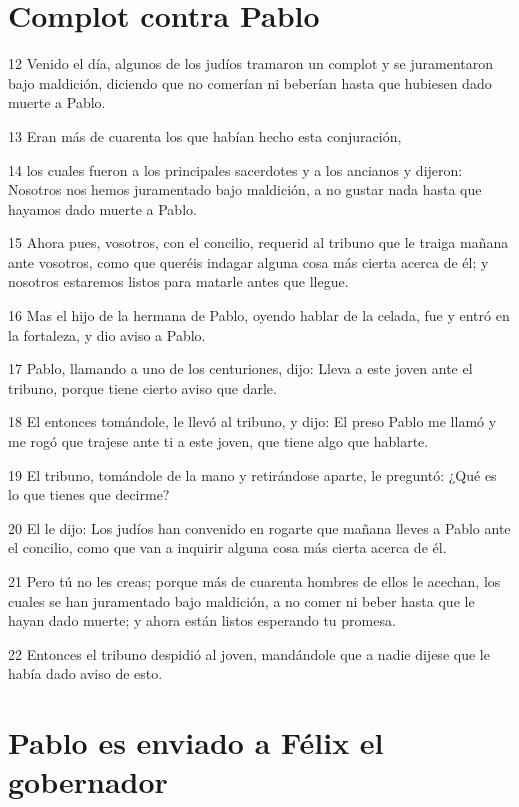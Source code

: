 \section*{Complot contra Pablo}

\par 12 Venido el día, algunos de los judíos tramaron un complot y se juramentaron bajo maldición, diciendo que no comerían ni beberían hasta que hubiesen dado muerte a Pablo.
\par 13 Eran más de cuarenta los que habían hecho esta conjuración,
\par 14 los cuales fueron a los principales sacerdotes y a los ancianos y dijeron: Nosotros nos hemos juramentado bajo maldición, a no gustar nada hasta que hayamos dado muerte a Pablo.
\par 15 Ahora pues, vosotros, con el concilio, requerid al tribuno que le traiga mañana ante vosotros, como que queréis indagar alguna cosa más cierta acerca de él; y nosotros estaremos listos para matarle antes que llegue.
\par 16 Mas el hijo de la hermana de Pablo, oyendo hablar de la celada, fue y entró en la fortaleza, y dio aviso a Pablo.
\par 17 Pablo, llamando a uno de los centuriones, dijo: Lleva a este joven ante el tribuno, porque tiene cierto aviso que darle.
\par 18 El entonces tomándole, le llevó al tribuno, y dijo: El preso Pablo me llamó y me rogó que trajese ante ti a este joven, que tiene algo que hablarte.
\par 19 El tribuno, tomándole de la mano y retirándose aparte, le preguntó: ¿Qué es lo que tienes que decirme?
\par 20 El le dijo: Los judíos han convenido en rogarte que mañana lleves a Pablo ante el concilio, como que van a inquirir alguna cosa más cierta acerca de él.
\par 21 Pero tú no les creas; porque más de cuarenta hombres de ellos le acechan, los cuales se han juramentado bajo maldición, a no comer ni beber hasta que le hayan dado muerte; y ahora están listos esperando tu promesa.
\par 22 Entonces el tribuno despidió al joven, mandándole que a nadie dijese que le había dado aviso de esto.

\section*{Pablo es enviado a Félix el gobernador}


